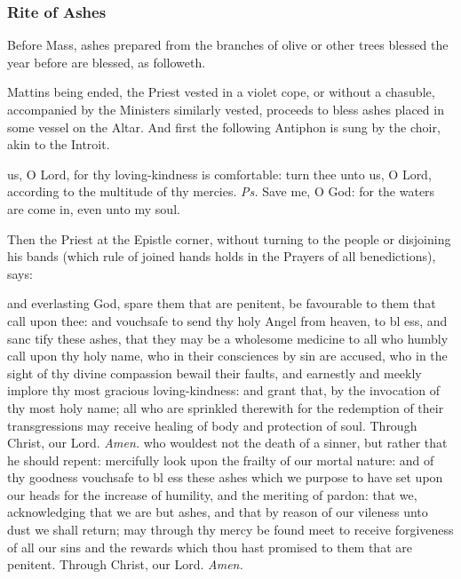 \subsubsection{Rite of Ashes}
\begin{rubric}
    Before Mass, ashes prepared from the branches of olive or other trees blessed the year before are blessed, as followeth.
\end{rubric}
\begin{rubric}
Mattins being ended, the Priest vested in a violet cope, or without a chasuble, accompanied by the Ministers similarly vested, proceeds to bless ashes placed in some vessel on the Altar. And first the following Antiphon is sung by the choir, akin to the Introit.
\end{rubric}
 us, O Lord, for thy loving-kindness is comfortable: turn thee unto us, O Lord, according to the multitude of thy mercies. \textit{Ps.} Save me, O God: for the waters are come in, even unto my soul.
\begin{rubric}
    Then the Priest at the Epistle corner, without turning to the people or disjoining his bands (which rule of joined hands holds in the Prayers of all benedictions), says:
\end{rubric}
{} and everlasting God, spare them that are penitent, be favourable to them that call upon thee: and vouchsafe to send thy holy Angel from heaven, to bl {} ess, and sanc {} tify these ashes, that they may be a wholesome medicine to all who humbly call upon thy holy name, who in their consciences by sin are accused, who in the sight of thy divine compassion bewail their faults, and earnestly and meekly implore thy most gracious loving-kindness: and grant that, by the invocation of thy most holy name; all who are sprinkled therewith for the redemption of their transgressions may receive healing of body and protection of soul. Through Christ, our Lord. \textit{Amen.}
{} who wouldest not the death of a sinner, but rather that he should repent: mercifully look upon the frailty of our mortal nature: and of thy goodness vouchsafe to bl {} ess these ashes which we purpose to have set upon our heads for the increase of humility, and the meriting of pardon: that we, acknowledging that we are but ashes, and that by reason of our vileness unto dust we shall return; may through thy mercy be found meet to receive forgiveness of all our sins and the rewards which thou hast promised to them that are penitent. Through Christ, our Lord. \textit{Amen.}
